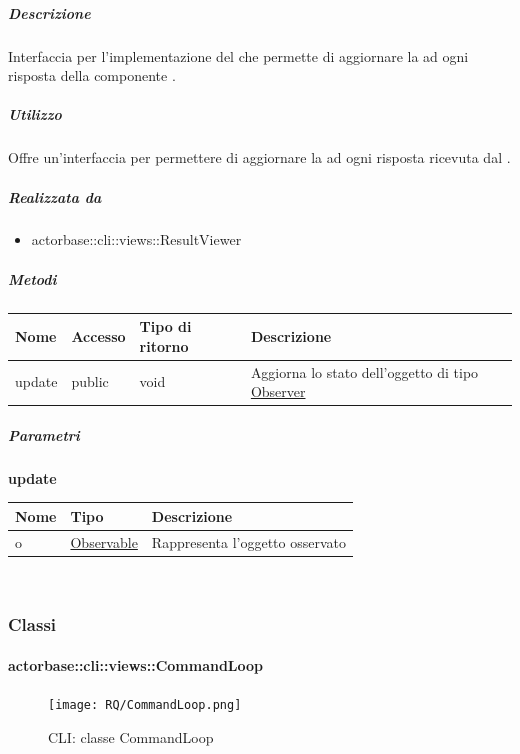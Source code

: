 \documentclass{scalatekids-article}
\begin{document}
\subparagraph{Descrizione}
Interfaccia per l'implementazione del  
che permette di aggiornare la  ad ogni risposta della componente
.

\subparagraph{Utilizzo}
Offre un'interfaccia per permettere di aggiornare la  ad ogni
risposta ricevuta dal .

\subparagraph{Realizzata da}
\begin{itemize}
\item actorbase::cli::views::ResultViewer
\end{itemize}

\subparagraph{Metodi}
\begin{tabular}{| l | l | l | l |}
  \hline
  Nome & Accesso & Tipo di ritorno & Descrizione\\
  \hline
  update & public & void & Aggiorna lo stato dell'oggetto di tipo \hyperref[sec:actorbase::cli::views::Observer]{Observer}\\
  \hline
\end{tabular}

\subparagraph{Parametri}
\begin{center}
  \textbf{update}
\end{center}
\begin{tabular}{| p{3cm} | p{3.5cm} | p{8.5cm} |}
  \hline
  Nome & Tipo & Descrizione\\
  \hline
  o & \hyperref[actorbase::cli::models::Observable]{Observable} & Rappresenta l'oggetto osservato\\
  \hline
\end{tabular}\\

\subsubsection{Classi}

\paragraph{actorbase::cli::views::CommandLoop}
\label{sec:actorbase::cli::views::CommandLoop}

\begin{figure}[H]
  \begin{center}
    \texttt{[image: RQ/CommandLoop.png]}
    \caption{CLI: classe CommandLoop}
  \end{center}
\end{figure}
\end{document}
